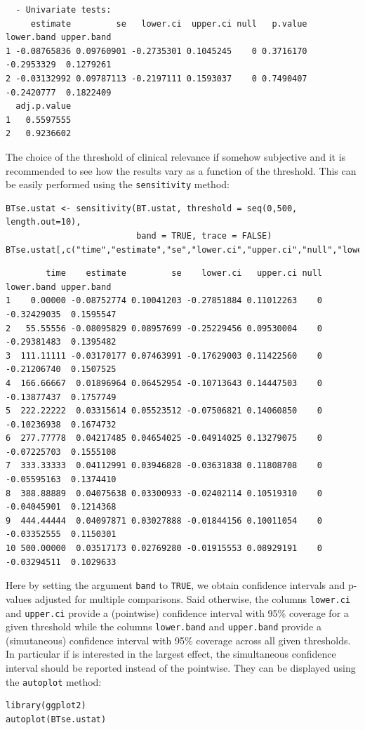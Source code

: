 \documentclass[12pt]{article}
\begin{document}
\begin{verbatim}
  - Univariate tests:
     estimate         se   lower.ci  upper.ci null   p.value lower.band upper.band
1 -0.08765836 0.09760901 -0.2735301 0.1045245    0 0.3716170 -0.2953329  0.1279261
2 -0.03132992 0.09787113 -0.2197111 0.1593037    0 0.7490407 -0.2420777  0.1822409
  adj.p.value
1   0.5597555
2   0.9236602
\end{verbatim}





The choice of the threshold of clinical relevance if somehow
subjective and it is recommended to see how the results vary as a
function of the threshold. This can be easily performed using the
\texttt{sensitivity} method:
\lstset{language=r,label= ,caption= ,captionpos=b,numbers=none}
\begin{lstlisting}
BTse.ustat <- sensitivity(BT.ustat, threshold = seq(0,500, length.out=10),
                          band = TRUE, trace = FALSE)
BTse.ustat[,c("time","estimate","se","lower.ci","upper.ci","null","lower.band","upper.band")]
\end{lstlisting}

\begin{verbatim}
        time    estimate         se    lower.ci   upper.ci null  lower.band upper.band
1    0.00000 -0.08752774 0.10041203 -0.27851884 0.11012263    0 -0.32429035  0.1595547
2   55.55556 -0.08095829 0.08957699 -0.25229456 0.09530004    0 -0.29381483  0.1395482
3  111.11111 -0.03170177 0.07463991 -0.17629003 0.11422560    0 -0.21206740  0.1507525
4  166.66667  0.01896964 0.06452954 -0.10713643 0.14447503    0 -0.13877437  0.1757749
5  222.22222  0.03315614 0.05523512 -0.07506821 0.14060850    0 -0.10236938  0.1674732
6  277.77778  0.04217485 0.04654025 -0.04914025 0.13279075    0 -0.07225703  0.1555108
7  333.33333  0.04112991 0.03946828 -0.03631838 0.11808708    0 -0.05595163  0.1374410
8  388.88889  0.04075638 0.03300933 -0.02402114 0.10519310    0 -0.04045901  0.1214368
9  444.44444  0.04097871 0.03027888 -0.01844156 0.10011054    0 -0.03352555  0.1150301
10 500.00000  0.03517173 0.02769280 -0.01915553 0.08929191    0 -0.03294511  0.1029633
\end{verbatim}

Here by setting the argument \texttt{band} to \texttt{TRUE}, we obtain confidence
intervals and p-values adjusted for multiple comparisons. Said
otherwise, the columns \texttt{lower.ci} and \texttt{upper.ci} provide a (pointwise)
confidence interval with 95\% coverage for a given threshold while the
columns \texttt{lower.band} and \texttt{upper.band} provide a (simutaneous)
confidence interval with 95\% coverage across all given thresholds. In
particular if is interested in the largest effect, the simultaneous
confidence interval should be reported instead of the pointwise. They
can be displayed using the \texttt{autoplot} method:
\lstset{language=r,label= ,caption= ,captionpos=b,numbers=none}
\begin{lstlisting}
library(ggplot2)
autoplot(BTse.ustat)
\end{lstlisting}
\end{document}
